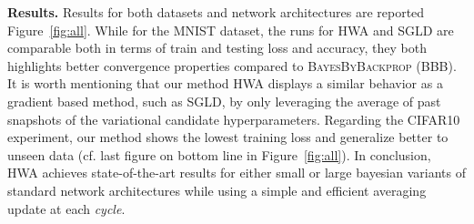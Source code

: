 \documentclass[tablecaption=bottom,wcp]{jmlr}
\begin{document}
\vspace{0.08in}
\noindent \textbf{Results.} \hspace{0.1in} 
Results for both datasets and network architectures are reported Figure~\ref{fig:all}.
While for the MNIST dataset, the runs for \textsc{HWA} and \textsc{SGLD} are comparable both in terms of train and testing loss and accuracy, they both highlights better convergence properties compared to \textsc{BayesByBackprop} (BBB).
It is worth mentioning that our method \textsc{HWA} displays a similar behavior as a gradient based method, such as \textsc{SGLD}, by only leveraging the average of past snapshots of the variational candidate hyperparameters. 
Regarding the CIFAR10 experiment, our method shows the lowest training loss and generalize better to unseen data (cf. last figure on bottom line in Figure~\ref{fig:all}).
In conclusion, \textsc{HWA} achieves state-of-the-art results for either small or large bayesian variants of standard network architectures while using a simple and efficient averaging update at each \textit{cycle}.
\end{document}

